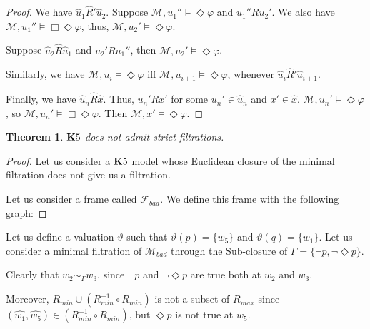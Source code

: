 \documentclass[a4paper]{article}
\theoremstyle{defin}
\theoremstyle{theorem}
\newtheorem{theorem}{Theorem}
\theoremstyle{prop}
\theoremstyle{lemma}
\theoremstyle{fact}
\theoremstyle{ex}
\theoremstyle{col}
\begin{document}
\begin{proof}
  We have $\hat{u}_1 \widehat{R}' \hat{u}_2$. Suppose $\mathcal{M}, u_1'' \models \Diamond \varphi$ and $u_1'' R u_2'$.
  We also have $\mathcal{M}, u_1'' \models \Box \Diamond \varphi$, thus, $\mathcal{M}, u_2' \models \Diamond \varphi$.

  Suppose $\hat{u}_2 \widehat{R} \hat{u}_1$ and $u_2' R u_1''$, then $\mathcal{M}, u_2' \models \Diamond \varphi$.

  Similarly, we have $\mathcal{M}, u_i \models \Diamond \varphi$ iff $\mathcal{M}, u_{i + 1} \models \Diamond \varphi$, whenever $\hat{u}_i \widehat{R}' \hat{u}_{i + 1}$.

  Finally, we have $\hat{u}_n \widehat{R} \hat{x}$. Thus, $u_n' R x'$ for some $u_n' \in \hat{u}_n$ and $x' \in \hat{x}$. $\mathcal{M}, u_n' \models \Diamond \varphi$, so $\mathcal{M}, u_n' \models \Box \Diamond \varphi$. Then $\mathcal{M}, x' \models \Diamond \varphi$.
\end{proof}

\begin{theorem}\label{sad}
  ${\bf K}5$ does not admit strict filtrations.
\end{theorem}

\begin{proof}
  Let us consider a ${\bf K}5$ model whose Euclidean closure of the minimal filtration does not give us a filtration.

  Let us consider a frame called $\mathcal{F}_{bad}$. We define this frame with the following graph:

\vspace{\baselineskip}

\end{proof}

Let us define a valuation $\vartheta$ such that $\vartheta(p) = \{ w_5\}$ and $\vartheta(q) = \{ w_1\}$. Let us consider a minimal filtration of $\mathcal{M}_{bad}$ through the Sub-closure of $\Gamma = \{ \neg p, \neg \Diamond p\}$.

Clearly that $w_2 \sim_{\Gamma} w_3$, since $\neg p$ and $\neg \Diamond p$ are true both at $w_2$ and $w_3$.

Moreover, $R_{min} \cup (R_{min}^{-1} \circ R_{min})$ is not a subset of $R_{max}$ since $(\hat{w_1}, \hat{w_5}) \in (R_{min}^{-1} \circ R_{min})$, but $\Diamond p$ is not true at $w_5$.
\end{document}
